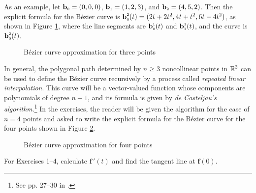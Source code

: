 \begin{exmp}
 As an example, let $\textbf{b}_{\scriptscriptstyle 0} = (0,0,0)$, $\textbf{b}_{\scriptscriptstyle 1} = (1,2,3)$, and $\textbf{b}_{\scriptscriptstyle 2} =
 (4,5,2)$. Then the explicit formula for the B\'{e}zier curve is
 $\textbf{b}_{\scriptscriptstyle 0}^{\scriptscriptstyle 2}(t) = ( 2t + 2t^2, 4t + t^2, 6t - 4t^2 )$, as shown in Figure
 \ref{fig:bezier2}, where the line segments are $\textbf{b}_{\scriptscriptstyle 0}^{\scriptscriptstyle 1}(t)$ and
 $\textbf{b}_{\scriptscriptstyle 1}^{\scriptscriptstyle 1}(t)$, and the curve is
 $\textbf{b}_{\scriptscriptstyle 0}^{\scriptscriptstyle 2}(t)$.\vspace{-14mm}
 \begin{figure}[h]
  \begin{center}
   
  \end{center}\vspace{-16mm}
 \caption[]{\quad B\'{e}zier curve approximation for three points}
 \label{fig:bezier2}
 \end{figure}
\newpage
 In general, the polygonal path determined by $n \ge 3$ noncollinear points in $\mathbb{R}^{3}$ can be used to define
 the B\'{e}zier curve recursively by a process called \emph{repeated linear interpolation}. This curve will be a
 vector-valued function whose components are polynomials of degree $n-1$, and its formula is given by
 \emph{de Casteljau's algorithm}.\footnote{See pp. 27--30 in \cite{far}.} In the exercises, the reader will be given the
 algorithm for the case of $n = 4$ points and asked to write the explicit formula for the B\'{e}zier curve for the four
 points shown in Figure \ref{fig:bezier3}.\vspace{-24mm}
 \begin{figure}[h]
  \begin{center}
   
  \end{center}\vspace{-16mm}
 \caption[]{\quad B\'{e}zier curve approximation for four points}
 \label{fig:bezier3}
 \end{figure}
\end{exmp}\vspace{-12mm}
\startexercises\label{sec1dot8}
\par\noindent For Exercises 1--4, calculate $\textbf{f}\,'(t)$ and find the tangent line at $\textbf{f}(0)$.
